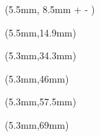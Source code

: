\documentclass[final]{article}
\begin{document}
\raggedright
\color{white}


\newlength{\originalhight}
\newlength{\originallength}
\newlength{\perfecthight}
\setlength{\perfecthight}{10pt}
\newlength{\maxlength}
\setlength{\maxlength}{40mm}
\settoheight{\originalhight}{\noindent \fontsize{10}{10} \selectfont{\MakeUppercase{\playername}}
		\ifdim \originallength > \maxlength
		\resizebox{\maxlength}{!}{\noindent \fontsize{10}{10} \selectfont{\MakeUppercase{\playername}}}
		\else
		\noindent \fontsize{10}{10} \selectfont{\MakeUppercase{\playername}}
		\fi}

\begin{textblock*}{40mm}(5.5mm, 8.5mm + \perfecthight - \originalhight)
	\settowidth{\originallength}{\noindent \fontsize{10}{10} \selectfont\textbf{\color{namecolor}\MakeUppercase{\playername}}}
	\ifdim \originallength > \maxlength
		\resizebox{\maxlength}{!}{\noindent \fontsize{10}{10} \selectfont\textbf{\color{namecolor}\MakeUppercase{\playername}}}
	\else
		\noindent \fontsize{10}{10} \selectfont\textbf{\color{namecolor}\MakeUppercase{\playername}}
	\fi
\end{textblock*}


\begin{textblock*}{30mm}(5.5mm,14.9mm)
	\noindent \fontsize{8}{8} \selectfont \textcolor{positioncolor}{\position}
\end{textblock*}

\begin{textblock*}{13mm}(5.3mm,34.3mm)
	\noindent \fontsize{11}{11} \trebuchet {\cata}
\end{textblock*}
\begin{textblock*}{11mm}(5.3mm,46mm)
	\noindent \fontsize{11}{11} \trebuchet {\catb}
\end{textblock*}
\begin{textblock*}{10mm}(5.3mm,57.5mm)
	\noindent \fontsize{11}{11} \trebuchet {\catc}
\end{textblock*}
\begin{textblock*}{11mm}(5.3mm,69mm)
	\noindent \fontsize{11}{11} \trebuchet {\catd}
\end{textblock*}
\end{document}
